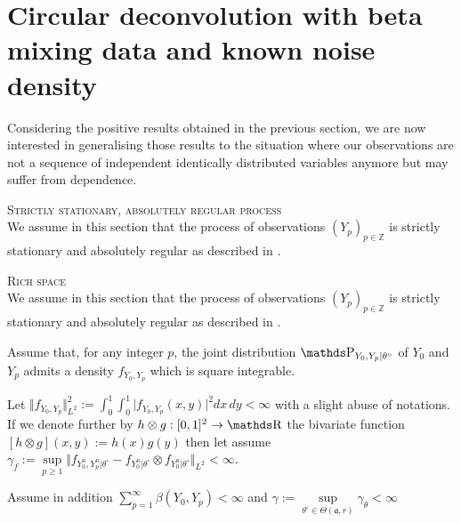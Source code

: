 \section{Circular deconvolution with beta mixing data and known noise density}\label{FREQ_CIRCDECONV_KNOWN_BETA}

Considering the positive results obtained in the previous section, we are now interested in generalising those results to the situation where our observations are not a sequence of independent identically distributed variables anymore but may suffer from dependence.

\begin{as}{\textsc{Strictly stationary, absolutely regular process} \\}\label{AS_FREQ_CIRCDECONV_KNOWN_BETA_STRICTLYSTA}
We assume in this section that the process of observations $(Y_{p})_{p \in \mathds{Z}}$ is strictly stationary and absolutely regular as described in .
\end{as}

\begin{as}{\textsc{Rich space} \\}\label{AS_FREQ_CIRCDECONV_KNOWN_BETA_RICHSPACE}
We assume in this section that the process of observations $(Y_{p})_{p \in \mathds{Z}}$ is strictly stationary and absolutely regular as described in .
\end{as}

\begin{as}\label{AS_FREQ_CIRCDECONV_KNOWN_BETA_JOINT}
Assume that, for any integer $p$, the joint distribution $\P_{Y_{0}, Y_{p} \vert \theta^{\circ}}$ of $Y_{0}$ and $Y_{p}$ admits a density $f_{Y_{0}, Y_{p}}$ which is square integrable.

Let $\Vert f_{Y_{0}, Y_{p}} \Vert_{L^{2}}^{2} := \int_{0}^{1} \int_{0}^{1} \vert f_{Y_{0}, Y_{p}}(x, y)\vert^{2}dx \, dy < \infty$ with a slight abuse of notations.
If we denote further by $h \otimes g : [0, 1]^{2} \rightarrow \R$ the bivariate function $[h \otimes g](x, y) := h(x) g(y)$ then let assume $\gamma_{f} := \sup\limits_{p \geq 1} \Vert f_{Y_{0}^{n}, Y_{p}^{n}\vert \theta^{\circ}} - f_{Y_{0}^{n}\vert \theta^{\circ}} \otimes f_{Y_{0}^{n}\vert \theta^{\circ}} \Vert_{L^{2}} < \infty$.

Assume in addition $\sum\limits_{p = 1}^{\infty} \beta(Y_{0}, Y_{p}) < \infty$ and $\gamma := \sup\limits_{\theta^{\circ} \in \Theta(\mathfrak{a}, r)} \gamma_{\theta} < \infty$
\end{as}


